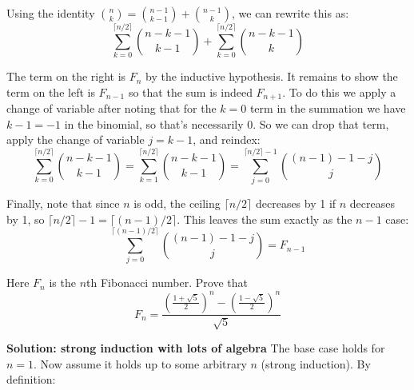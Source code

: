 \documentclass{article}
\begin{document}
Using the identity $\binom{n}{k} = \binom{n-1}{k-1} + \binom{n-1}{k}$, we can rewrite this as:
$$\sum_{k=0}^{\lceil n / 2 \rceil} \binom{n - k - 1}{k - 1} + \sum_{k=0}^{\lceil n / 2 \rceil} \binom{n-k-1}{k}$$

The term on the right is $F_n$ by the inductive hypothesis. It remains to show the term on the left is $F_{n-1}$ so that the sum is indeed $F_{n+1}$. To do this we apply a change of variable after noting that for the $k = 0$ term in the summation we have $k - 1 = -1$ in the binomial, so that's necessarily 0. So we can drop that term, apply the change of variable $j = k-1$, and reindex:
$$\sum_{k=0}^{\lceil n / 2 \rceil} \binom{n - k - 1}{k - 1} = \sum_{k=1}^{\lceil n / 2 \rceil} \binom{n - k - 1}{k - 1} = \sum_{j=0}^{\lceil n / 2 \rceil - 1} \binom{(n - 1) - 1 - j}{j}$$

Finally, note that since $n$ is odd, the ceiling $\lceil n / 2 \rceil$ decreases by 1 if $n$ decreases by 1, so $\lceil n / 2 \rceil - 1 = \lceil (n - 1) / 2\rceil$. This leaves the sum exactly as the $n - 1$ case:
$$\sum_{j=0}^{\lceil (n - 1) / 2\rceil} \binom{(n-1) - 1 - j}{j} = F_{n-1}$$

\begin{problem}
Here $F_n$ is the $n$th Fibonacci number. Prove that
$$F_n = \frac{\left(\frac{1 + \sqrt{5}}{2}\right)^n - \left(\frac{1 - \sqrt{5}}{2}\right)^n}{\sqrt{5}}$$
\end{problem}

\textbf{Solution: strong induction with lots of algebra}
The base case holds for $n = 1$. Now assume it holds up to some arbitrary $n$ (strong induction). By definition:
\end{document}
